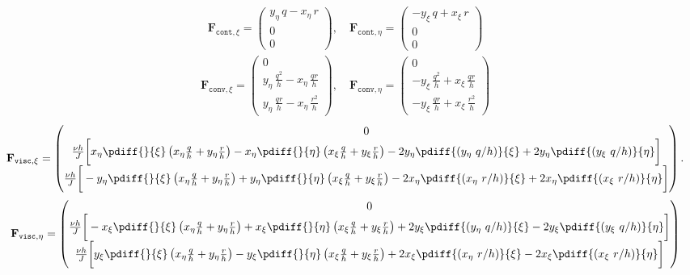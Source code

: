 %
	\begin{align}\label{eq:FxysplitT}
		\mathbf{F}_{\texttt{cont},\xi}=
		\begin{pmatrix}
			y_{\eta}\, q - x_{\eta}\, r\\
			0\\
			0
		\end{pmatrix},
		\quad
		\mathbf{F}_{\texttt{cont},\eta}=
		\begin{pmatrix}
			-y_{\xi}\, q + x_{\xi}\, r\\
			0 \\
			0
		\end{pmatrix}
	\end{align}
	\begin{align}
		\mathbf{F}_{\texttt{conv},\xi}=
		\begin{pmatrix}
			0\\
			y_{\eta}\, \frac{q^2}{h} - x_{\eta}\, \frac{q r}{h}\\
			y_{\eta}\, \frac{q r}{h} - x_{\eta}\, \frac{r^2}{h}
		\end{pmatrix},
		\quad
		\mathbf{F}_{\texttt{conv},\eta}=
		\begin{pmatrix}
			0\\
			-y_{\xi}\, \frac{q^2}{h} + x_{\xi}\, \frac{q r}{h}
			\\
			-y_{\xi}\, \frac{q r}{h} + x_{\xi}\, \frac{r^2}{h}
		\end{pmatrix}
	\end{align}
	\begin{align}
		\mathbf{F}_{\texttt{visc},\xi}=
		\begin{pmatrix}
			0 \\
			\frac{\nu h}{J} \bigg[
			x_{\eta} \pdiff{}{\xi}\left( x_{\eta}\frac{q}{h} + y_{\eta}\frac{r}{h}  \right)
			- x_{\eta} \pdiff{}{\eta}\left( x_{\xi} \frac{q}{h} + y_{\xi} \frac{r}{h}  \right)
			- 2 y_{\eta}  \pdiff{(y_{\eta}\ q/h)}{\xi}
			+ 2 y_{\eta}  \pdiff{(y_{\xi}\ q/h)}{\eta}\bigg]\\
			\frac{\nu h}{J} \bigg[
			-y_{\eta} \pdiff{}{\xi} \left(
			x_{\eta} \frac{q}{h}+ y_{\eta} \frac{r}{h} \right)
			+ y_{\eta} \pdiff{}{\eta} \left(
			x_{\xi} \frac{q}{h} + y_{\xi} \frac{r}{h}  \right)
			- 2 x_{\eta} \pdiff{(x_{\eta}\ r/h)}{\xi}
			+ 2 x_{\eta}  \pdiff{(x_{\xi}\ r/h)}{\eta} \bigg]
		\end{pmatrix}.
	\end{align}
	\begin{align}
		\mathbf{F}_{\texttt{visc},\eta}=
		\begin{pmatrix}
			0 \\
			\frac{\nu h}{J} \bigg[
			- x_{\xi} \pdiff{}{\xi}\left( x_{\eta}\frac{q}{h} + y_{\eta}\frac{r}{h}  \right)
			+ x_{\xi} \pdiff{}{\eta}\left( x_{\xi} \frac{q}{h} + y_{\xi} \frac{r}{h}  \right)
			+ 2 y_{\xi} \pdiff{(y_{\eta}\ q/h)}{\xi}
			- 2 y_{\xi} \pdiff{(y_{\xi}\ q/h)}{\eta} \bigg]
			\\
			\frac{\nu h}{J} \bigg[
			y_{\xi} \pdiff{}{\xi} \left(x_{\eta} \frac{q}{h}
			+ y_{\eta} \frac{r}{h} \right)
			- y_{\xi} \pdiff{}{\eta} \left( x_{\xi} \frac{q}{h} +  y_{\xi} \frac{r}{h} \right)
			+ 2 x_{\xi} \pdiff{(x_{\eta}\ r/h)}{\xi}
			- 2 x_{\xi} \pdiff{(x_{\xi}\ r/h)}{\eta} \bigg]
		\end{pmatrix}
	\end{align}
